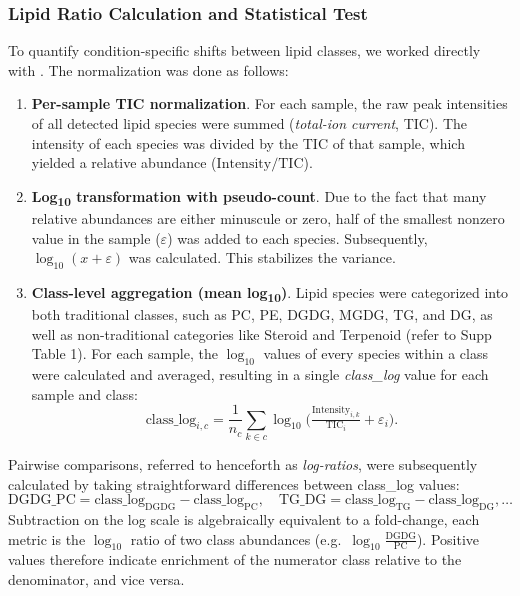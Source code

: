 \documentclass[10pt,letterpaper]{article}
\begin{document}
\subsubsection*{Lipid Ratio Calculation and Statistical Test}

To quantify condition-specific shifts between lipid classes, we worked directly with 
.  
The normalization was done as follows:

\begin{enumerate}
  \item \textbf{Per-sample TIC normalization}.  
        For each sample, the raw peak intensities of all detected lipid species were summed (\emph{total-ion current}, TIC). The intensity of each species was divided by the TIC of that sample, which yielded a relative abundance (\(\mathrm{Intensity}/\mathrm{TIC}\)).
  \item \textbf{Log\textsubscript{10} transformation with pseudo-count}.  
        Due to the fact that many relative abundances are either minuscule or zero, half of the smallest nonzero value in the sample (\(\varepsilon\)) was added to each species. Subsequently, \(\log_{10}(x+\varepsilon)\) was calculated.
        This stabilizes the variance.
  \item \textbf{Class-level aggregation (mean log\textsubscript{10})}.  
        Lipid species were categorized into both traditional classes, such as PC, PE, DGDG, MGDG, TG, and DG, as well as non-traditional categories like Steroid and Terpenoid (refer to Supp Table 1). For each sample, the \(\log_{10}\) values of every species within a class were calculated and averaged, resulting in a single \emph{class\_log} value for each sample and class: \[
          \text{class\_log}_{i,c}=\frac{1}{n_c}\sum_{k\in c}\log_{10}
            \bigl(\tfrac{\mathrm{Intensity}_{i,k}}{\mathrm{TIC}_i}+\varepsilon_i\bigr).
        \]
\end{enumerate}

Pairwise comparisons, referred to henceforth as \emph{log-ratios}, were subsequently calculated by taking straightforward differences between class\_log values:\[
  \mathrm{DGDG\_PC} = \text{class\_log}_{\mathrm{DGDG}} -
                      \text{class\_log}_{\mathrm{PC}},
  \quad
  \mathrm{TG\_DG}   = \text{class\_log}_{\mathrm{TG}} -
                      \text{class\_log}_{\mathrm{DG}},
  \ldots
\]
Subtraction on the log scale is algebraically equivalent to a
fold-change, each metric is the \(\log_{10}\) ratio of two class abundances
(e.g.\ \(\log_{10}\tfrac{\text{DGDG}}{\text{PC}}\)).
Positive values therefore indicate enrichment of the numerator class relative
to the denominator, and vice versa.
\end{document}

